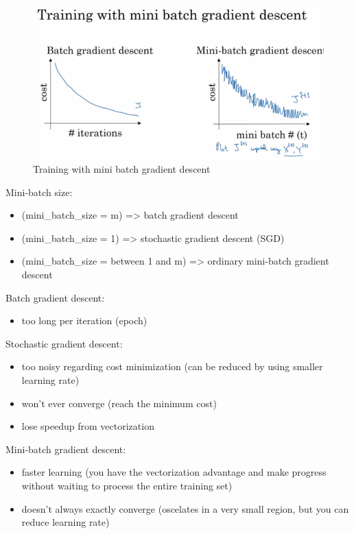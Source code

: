 \begin{figure}
    \centering
    \includegraphics[width=1.0\textwidth, trim={0 35 0 70}, clip]{img/c2/batch_vs_mini_batch_cost.png}
    \caption{Training with mini batch gradient descent}
    \label{mini-batch-gradient}
\end{figure}

Mini-batch size:
\begin{itemize}
    \item (mini\_batch\_size = m) => batch gradient descent
    \item (mini\_batch\_size = 1) => stochastic gradient descent (SGD)
    \item (mini\_batch\_size =  between 1 and m) => ordinary mini-batch gradient descent
\end{itemize}

Batch gradient descent:
\begin{itemize}
    \item too long per iteration (epoch)
\end{itemize}

Stochastic gradient descent:
\begin{itemize}
    \item too noisy regarding cost minimization (can be reduced by using smaller learning rate)
    \item won't ever converge (reach the minimum cost)
    \item lose speedup from vectorization
\end{itemize}

Mini-batch gradient descent:
\begin{itemize}
    \item faster learning (you have the vectorization advantage and make progress without waiting to process the entire training set)
    \item doesn't always exactly converge (oscelates in a very small region, but you can reduce learning rate)
\end{itemize}

